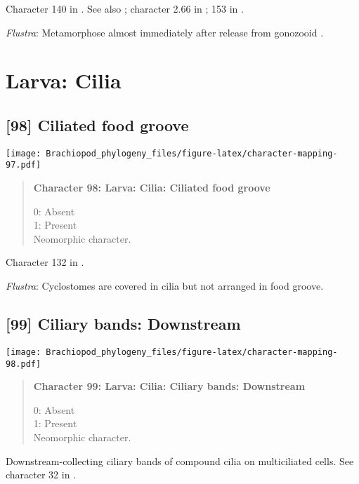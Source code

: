\documentclass[openany]{book}
\theoremstyle{definition}
\theoremstyle{definition}
\theoremstyle{definition}
\theoremstyle{remark}
\begin{document}
Character 140 in \citet{Rouse1999}. See also \citet{Collin1997};
character 2.66 in \citet{SPS1996}; 153 in \citet{Giribet2002}.

\hypertarget{Flustra-coding-97}{}
\emph{Flustra}: Metamorphose almost immediately after release from
gonozooid \citep{Zimmer2013}.

\section{Larva: Cilia}\label{larva-cilia}

\subsection*{{[}98{]} Ciliated food groove}\label{ciliated-food-groove}

\texttt{[image: Brachiopod\_phylogeny\_files/figure-latex/character-mapping-97.pdf]}

\begin{quote}
\textbf{Character 98: Larva: Cilia: Ciliated food groove}

0: Absent\\
1: Present\\
Neomorphic character.
\end{quote}

Character 132 in \citet{Rouse1999}.

\hypertarget{Flustra-coding-98}{}
\emph{Flustra}: Cyclostomes are covered in cilia but not arranged in
food groove.

\subsection*{{[}99{]} Ciliary bands:
Downstream}\label{ciliary-bands-downstream}

\texttt{[image: Brachiopod\_phylogeny\_files/figure-latex/character-mapping-98.pdf]}

\begin{quote}
\textbf{Character 99: Larva: Cilia: Ciliary bands: Downstream}

0: Absent\\
1: Present\\
Neomorphic character.
\end{quote}

Downstream-collecting ciliary bands of compound cilia on multiciliated
cells. See character 32 in \citet{Glenner2004}.
\end{document}
